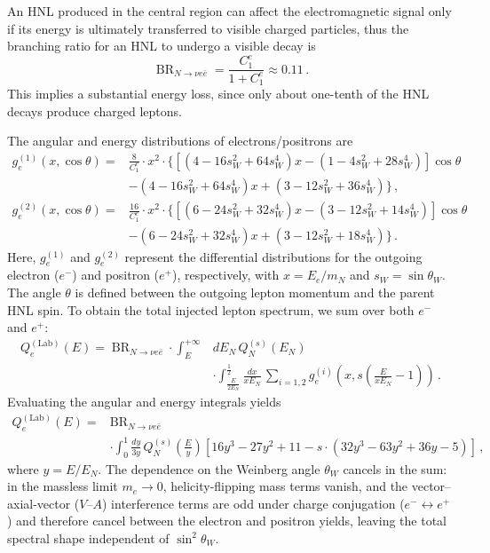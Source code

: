 \documentclass{ws-ijmpa}
\begin{document}
An HNL produced in the central region can affect the 
electromagnetic signal only if its energy is ultimately 
transferred to visible charged particles, thus the branching 
ratio for an HNL to undergo a visible decay is
\begin{equation}
  \operatorname{BR}_{N \to \nu e \bar{e}} = \frac{C_1^e}{1 + C_1^e} \approx 0.11\,.
\end{equation}
This implies a substantial energy loss, since only about one-tenth of the
HNL decays produce charged leptons.

The angular and energy distributions of electrons/positrons are
\begin{align}
  g_e^{(1)}(x, \cos{\theta}) = & \frac{8}{C_1^e} \cdot x^2 \cdot \{ [(4 - 16 s_W^2 + 64 s_W^4) x - (1 - 4 s_W^2 + 28 s_W^4)] \cos{\theta} \nonumber   \\
                               & - (4 - 16 s_W^2 + 64 s_W^4) x + (3 - 12 s_W^2 + 36 s_W^4) \}\,, \label{eq:g_e_p2}                                       \\
  g_e^{(2)}(x, \cos{\theta}) = & \frac{16}{C_1^e} \cdot x^2 \cdot \{ [(6 - 24 s_W^2 + 32 s_W^4) x - (3 - 12 s_W^2 + 14 s_W^4)] \cos{\theta} \nonumber \\
                               & - (6 - 24 s_W^2 + 32 s_W^4) x + (3 - 12 s_W^2 + 18 s_W^4) \}\,. \label{eq:g_e_p3}
\end{align}
Here, $g_e^{(1)}$ and $g_e^{(2)}$ represent the differential 
distributions for the outgoing electron ($e^-$) and positron 
($e^+$), respectively, with $x = E_e / m_N$ and $s_W = \sin{\theta_W}$. 
The angle $\theta$ is defined between the outgoing lepton momentum and the parent HNL spin. 
To obtain the total injected lepton spectrum, we sum over both $e^-$ and $e^+$:
\begin{align}
  Q_e^{(\mathrm{Lab})}(E) = \operatorname{BR}_{N \to \nu e \bar{e}} \cdot \int_{E}^{+\infty} &d E_N \, Q_N^{(s)}(E_N) \nonumber \\
  &\cdot \int_{\frac{E}{2 E_N}}^{\frac{1}{2}}  \frac{d x}{x E_N} \, \sum_{i=1,2} g_e^{(i)}(x, s (\frac{E}{x E_N} - 1))\,.
\end{align}
Evaluating the angular and energy integrals yields
\begin{align}
  Q_e^{(\mathrm{Lab})}(E) = &\operatorname{BR}_{N \to \nu e \bar{e}}  \nonumber\\
                   &\cdot \int_{0}^{1} \frac{d y}{3y} \, Q_N^{(s)}(\frac{E}{y}) [16 y^3 - 27 y^2 + 11 -  s \cdot (32 y^3 - 63 y^2 + 36 y - 5) ]\,,
\end{align}
where $y = E / E_N$. The dependence on the Weinberg angle $\theta_W$
cancels in the sum: in the massless limit $m_e \to 0$, helicity-flipping
mass terms vanish, and the vector--axial-vector ($V$--$A$) interference
terms are odd under charge conjugation ($e^- \leftrightarrow e^+$) and
therefore cancel between the electron and positron yields, leaving the total
spectral shape independent of $\sin^2\theta_W$.
\end{document}
